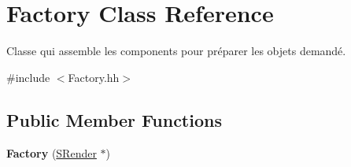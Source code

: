 \hypertarget{class_factory}{}\section{Factory Class Reference}
\label{class_factory}


Classe qui assemble les components pour préparer les objets demandé.  




{\ttfamily \#include $<$Factory.\+hh$>$}

\subsection*{Public Member Functions}
\begin{DoxyCompactItemize}
\item 
\hypertarget{class_factory_a7fb7e8f14920fa4658fdd081dc9b6a13}{}{\bfseries Factory} (\hyperlink{class_s_render}{S\+Render} $\ast$)\label{class_factory_a7fb7e8f14920fa4658fdd081dc9b6a13}


\end{DoxyCompactItemize}

